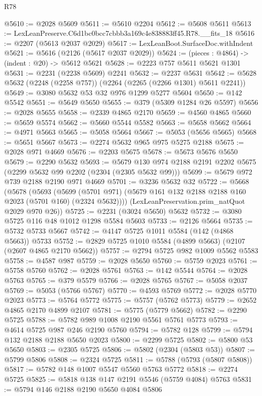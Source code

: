 \begin{lexlean}{R78}
\begin{coremodule}
@5610 := @2028 @5609
@5611 := @5610 @2204
@5612 := @5608 @5611
@5613 := LexLeanPreserve.C6d1bc0bcc7cbbb3a169c4e838883ff45.R78.__fits_18
@5616 := @2207 (@5613 @2037 @2029)
@5617 := LexLeanBoot.SurfaceDoc.withIndent
@5621 := @5616 (@2126 (@5617 @2037 @2029))
@5624 := (pieces : @4864) -> (indent : @20) -> @5612 @5621
@5628 := @2223 @757 @5611 @5621 @1301
@5631 := @2231 (@2238 @5609) @2241
@5632 := @2237 @5631
@5642 := @5628 @5632 (@2248 (@2258 @757)) (@2264 (@2265 (@2266 @1301) @5611 @2241))
@5649 := @3080 @5632 @53 @32 @976 @1299 @5277 @5604
@5650 := @142 @5542
@5651 := @5649 @5650
@5655 := @379 (@5309 @1284 @26 @5597)
@5656 := @2028 @5655
@5658 := @2339 @4865 @2170
@5659 := @4560 @4865
@5660 := @5659 @5574
@5662 := @5660 @5544 @5582
@5663 := @5658 @5662
@5664 := @4971 @5663
@5665 := @5058 @5664
@5667 := @5053 (@5656 @5665)
@5668 := @5651 @5667
@5673 := @2274 @5632 @965 @975 @5275 @2188
@5675 := @2028 @971 @4669
@5676 := @2203 @5675
@5678 := @5673 @5676 @5650
@5679 := @2290 @5632
@5693 := @5679 @130 @974 @2188 @2191 @2202 @5675 (@2299 @5632 @99 @2202 (@2304 (@2305 @5632 @99)))
@5699 := @5679 @972 @739 @2188 @2190 @971 @4669
@5701 := @3236 @5632 @32
@5722 := @5668
    (@5678
      (@5693
        (@5699 (@5701 @971) (@5679 @161 @132 @2188 @2188 @160 @2023 (@5701 @160) (@2324 @5632))))
      (LexLeanPreservation.prim_natQuot @2029 @970 @26))
@5725 := @2231 (@3024 @5650) @5632
@5732 := @3080 @5725 @116 @48 @1012 @1298 @5584 @5603
@5733 := @2126 @5664
@5735 := @5732 @5733 @5667
@5742 := @4147 @5725 @1011 @5584 (@142 (@4868 @5663)) @5733
@5752 := @2829 @5725 @1010 @5584 (@4899 @5663) (@2107 (@2607 @4865 @2170 @5662))
@5757 := @2794 @5725 @982 @1009 @5562 @5583
@5758 := @4587 @987
@5759 := @2028 @5650
@5760 := @5759 @2023
@5761 := @5758 @5760
@5762 := @2028 @5761
@5763 := @142 @5544
@5764 := @2028 @5763
@5765 := @379 @5579
@5766 := @2028 @5765
@5767 := @5058 @2037
@5769 := @5053 (@5766 @5767)
@5770 := @4593 @5769
@5772 := @2028 @5770 @2023
@5773 := @5764 @5772
@5775 := @5757 (@5762 @5773)
@5779 := @2652 @4865 @2170 @4899 @2107
@5781 := @5775 (@5779 @5662)
@5782 := @2290 @5725
@5788 := @5782 @989 @1008 @2190 @5561 @5761 @5773
@5793 := @4614 @5725 @987 @246 @2190 @5760
@5794 := @5782 @128
@5799 := @5794 @132 @2188 @2188 @5650 @2023
@5800 := @2299 @5725
@5802 := @5800 @53 @5650
@5803 := @2305 @5725
@5806 := @5802 (@2304 (@5803 @53))
@5807 := @5799 @5806
@5808 := @2324 @5725
@5811 := @5788 (@5793 (@5807 @5808))
@5817 := @5782 @148 @1007 @5547 @5560 @5763 @5772
@5818 := @2274 @5725
@5825 := @5818 @138 @147 @2191 @5546 (@5759 @4084) @5763
@5831 := @5794 @146 @2188 @2190 @5650 @4084 @5806

\end{coremodule}
\end{lexlean}

